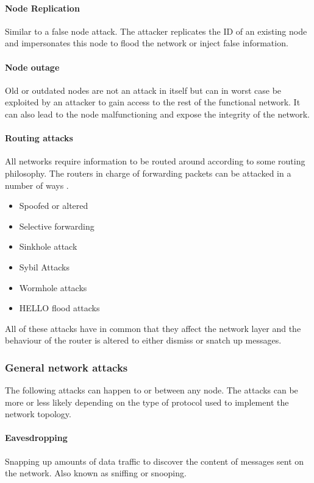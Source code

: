 \paragraph{Node Replication}
Similar to a false node attack. The attacker replicates the ID of an existing node and impersonates this node to flood the network or inject false information. 

\paragraph{Node outage}
Old or outdated nodes are not an attack in itself but can in worst case be exploited by an attacker to gain access to the rest of the functional network. It can also lead to the node malfunctioning and expose the integrity of the network. 

\paragraph{Routing attacks}
All networks require information to be routed around according to some routing philosophy. The routers in charge of forwarding packets can be attacked in a number of ways \cite{IJCSIS:attack_survey}. 

\begin{itemize}
    \item Spoofed or altered
    \item Selective forwarding
    \item Sinkhole attack
    \item Sybil Attacks
    \item Wormhole attacks
    \item HELLO flood attacks
\end{itemize}

All of these attacks have in common that they affect the network layer and the behaviour of the router is altered to either dismiss or snatch up messages.

\subsubsection{General network attacks}
The following attacks can happen to or between any node. The attacks can be more or less likely depending on the type of protocol used to implement the network topology. 

\paragraph{Eavesdropping}
Snapping up amounts of data traffic to discover the content of messages sent on the network. Also known as sniffing or snooping. 

